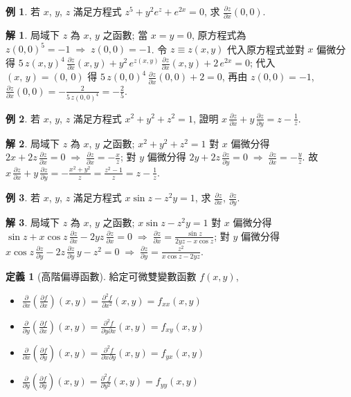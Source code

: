 \documentclass[12pt]{extarticle}
\newcommand{\ds}{\displaystyle}
\newcommand{\ie}{\;\Longrightarrow\;}
\theoremstyle{definition}
\newtheorem*{dfn}{定義}
\newtheorem*{ex}{例}
\newtheorem*{sol}{解}
\newcommand{\pdiff}[2]{\frac{\partial #1}{\partial #2}}
\begin{document}
\begin{ex} 
  若 $x$, $y$, $z$ 滿足方程式 $\ds z^5 + y^2 e^z + e^{2x} = 0$, 求 $\ds\pdiff{z}{x}(0, 0)$. 
\end{ex}
\begin{sol}
  局域下 $z$ 為 $x$, $y$ 之函數; 當 $x = y = 0$, 原方程式為 $\ds z(0, 0)^5 = -1\ie z(0, 0) = -1$. 令 $z\equiv z(x, y)$ 代入原方程式並對 $x$ 偏微分得 $\ds 5\,z(x, y)^4\,\pdiff{z}{x}(x, y) + y^2\,e^{z(x, y)}\,\pdiff{z}{x}(x,y) + 2\,e^{2x} = 0$; 代入 $(x,\,y) = (0,\,0)$ 得 $\ds 5\,z(0, 0)^4\,\pdiff{z}{x}(0, 0) + 2  = 0$, 再由 $z(0, 0) = -1$, $\ds\pdiff{z}{x}(0, 0) = -\frac{2}{5\,z(0, 0)^4} = -\frac{2}{5}$. 
\end{sol}

\begin{ex}
  若 $x$, $y$, $z$ 滿足方程式 $\ds x^2 + y^2 + z^2 = 1$, 證明 $\ds x\,\pdiff{z}{x} + y\,\pdiff{z}{y} = z - \frac{1}{z}$. 
\end{ex}

\begin{sol}
  局域下 $z$ 為 $x$, $y$ 之函數; $\ds x^2 + y^2 + z^2 = 1$ 對 $x$ 偏微分得 $\ds 2x + 2z\,\pdiff{z}{x} = 0 \ie \pdiff{z}{x} = -\frac{x}{z}$; 對 $y$ 偏微分得 $\ds 2y + 2z\,\pdiff{z}{y} = 0 \ie \pdiff{z}{x} = -\frac{y}{z}$. 故 $\ds x\,\pdiff{z}{x} + y\,\pdiff{z}{y} = -\frac{x^2 + y^2}{z} = \frac{z^2 - 1}{z} = z - \frac{1}{z}$. 
\end{sol}

\begin{ex}
  若 $x$, $y$, $z$ 滿足方程式 $\ds x\sin z - z^2 y = 1$, 求 $\ds\pdiff{z}{x}$, $\ds\pdiff{z}{y}$. 
\end{ex}

\begin{sol}
  局域下 $z$ 為 $x$, $y$ 之函數; $\ds x\sin z - z^2 y = 1$ 對 $x$ 偏微分得 $\ds\sin z + x\cos z\,\pdiff{z}{x} - 2yz\,\pdiff{z}{x} = 0 \ie \pdiff{z}{x} = \frac{\sin z}{2yz - x\cos z}$; 對 $y$ 偏微分得 $\ds x\cos z\,\pdiff{z}{y} - 2z\,\pdiff{z}{y}\,y - z^2 = 0 \ie \pdiff{z}{y} = \frac{z^2}{x\cos z - 2yz}$. 
\end{sol}

\begin{dfn}[高階偏導函數] 給定可微雙變數函數 $f(x, y)$, 
  \begin{multicols}{2}
    \begin{itemize}\setlength{\itemsep}{0pt}
      \item $\ds\pdiff{}{x}\left(\pdiff{f}{x}\right)(x,y) = \frac{\partial^2 f}{\partial x^2}(x,y) = f_{xx}(x,y)$
      \item $\ds\pdiff{}{y}\left(\pdiff{f}{x}\right)(x,y) = \frac{\partial^2 f}{\partial y\partial x}(x,y) = f_{xy}(x,y)$
      \item $\ds\pdiff{}{x}\left(\pdiff{f}{y}\right)(x,y) = \frac{\partial^2 f}{\partial x\partial y}(x,y) = f_{yx}(x,y)$
      \item $\ds\pdiff{}{y}\left(\pdiff{f}{y}\right)(x,y) = \frac{\partial^2 f}{\partial y^2}(x,y) = f_{yy}(x,y)$
    \end{itemize}
  \end{multicols}
\end{dfn}
\end{document}
